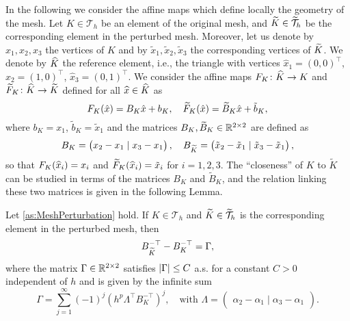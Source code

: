 \documentclass[10pt]{article}
\begin{document}
In the following we consider the affine maps which define locally the geometry of the mesh. Let $K \in \mathcal T_h$ be an element of the original mesh, and $\widetilde K \in \widetilde{\mathcal T}_h$ be the corresponding element in the perturbed mesh. Moreover, let us denote by $x_1, x_2, x_3$ the vertices of $K$ and by $\tilde x_1, \tilde x_2, \tilde x_3$ the corresponding vertices of $\widetilde K$. We denote by $\widehat K$ the reference element, i.e., the triangle with vertices $\hat x_1 = (0, 0)^\top$, $\hat x_2 = (1, 0)^\top$, $\hat x_3 = (0, 1)^\top$. We consider the affine maps $F_K \colon \widehat K \to K$ and $\widetilde F_K \colon \widehat K \to \widetilde K$ defined for all $\widehat x \in \widehat K$ as 
\begin{equation}
F_K(\hat x) = B_K\hat x + b_K, \quad \widetilde F_K(\hat x) = \widetilde B_K\hat x + \tilde b_K,
\end{equation}
where $b_K = x_1$, $\tilde b_K = \tilde x_1$ and the matrices $B_K, \widetilde B_K \in \mathbb{R}^{2\times 2}$ are defined as
\begin{equation}
B_K = \begin{pmatrix} x_2 - x_1 \mid x_3 - x_1 \end{pmatrix}, \quad B_{\widetilde K} = \begin{pmatrix} \tilde x_2 - \tilde x_1 \mid \tilde x_3 - \tilde x_1\end{pmatrix},
\end{equation}
so that $F_K(\widehat x_i) = x_i$ and $\widetilde F_K(\widehat x_i) = \tilde x_i$ for $i = 1, 2, 3$. The ``closeness'' of $K$ to $\widetilde K$ can be studied in terms of the matrices $B_K$ and $\widetilde B_K$, and the relation linking these two matrices is given in the following Lemma.
\begin{lemma}\label{lem:ReferenceMaps} Let \cref{as:MeshPerturbation} hold. If $K \in \mathcal T_h$ and $\widetilde K \in \widetilde{\mathcal T}_h$ is the corresponding element in the perturbed mesh, then
	\begin{equation}
		B_{\widetilde K}^{-\top} - B_K^{-\top} = \Gamma,
	\end{equation}
	where the matrix $\Gamma \in \mathbb{R}^{2 \times 2}$ satisfies $\lvert\Gamma\rvert \leq C$ a.s. for a constant $C > 0$ independent of $h$ and is given by the infinite sum
	\begin{equation}\label{eq:DefGammaMatrix}
		\Gamma = \sum_{j=1}^\infty (-1)^j \left(h^p \Lambda^\top B_K^{-\top}\right)^j, \quad \text{with } \Lambda = \begin{pmatrix} \alpha_2 - \alpha_1 \mid \alpha_3 - \alpha_1 \end{pmatrix}.
	\end{equation}
\end{lemma}
\end{document}
